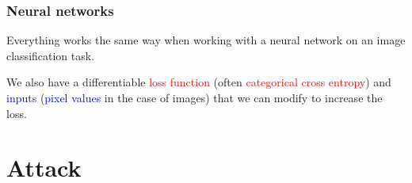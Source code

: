 \documentclass[9pt]{beamer}
\begin{document}
\begin{frame}
  \frametitle{Neural networks}

  Everything works the same way when working with a neural network on
  an image classification task.

  \bigskip

  We also have a differentiable \textcolor{red}{loss function} (often
  \textcolor{red}{categorical cross entropy}) and
  \textcolor{blue}{inputs} (\textcolor{blue}{pixel values} in the case
  of images) that we can modify to increase the loss.
\end{frame}

\section{Attack}


\end{document}
